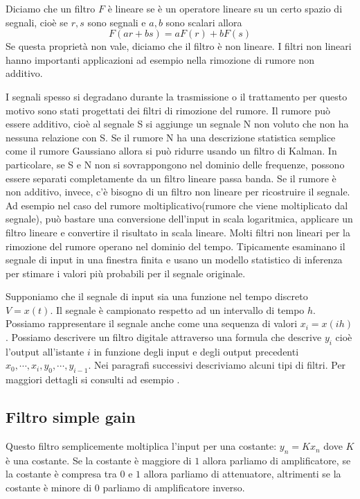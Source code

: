 Diciamo che un filtro $F$ \`e lineare se \`e un operatore lineare su un certo spazio di segnali, cio\`e se $r,s$ sono segnali e $a,b$ sono scalari allora 
\[
  F(ar + bs) = aF(r) + bF(s)
\]
Se questa propriet\`a non vale, diciamo che il filtro \`e non lineare. I filtri non lineari hanno importanti applicazioni ad esempio nella rimozione di rumore non additivo. 



I segnali spesso si degradano durante la trasmissione o il trattamento per questo motivo sono stati progettati dei filtri di rimozione del rumore. Il rumore pu\`o essere additivo, cio\`e al segnale S si aggiunge un segnale N non voluto che non ha nessuna relazione con S. Se il rumore N ha una descrizione statistica semplice come il rumore Gaussiano allora si pu\`o ridurre usando un filtro di Kalman. In particolare, se S e N non si sovrappongono nel dominio delle frequenze, possono essere separati completamente da un filtro lineare passa banda. 
Se il rumore \`e non additivo, invece, c'\`e bisogno di un filtro non lineare per ricostruire il segnale. Ad esempio nel caso del rumore moltiplicativo(rumore che viene moltiplicato dal segnale), pu\`o bastare una conversione dell'input in scala logaritmica, applicare un filtro lineare e convertire il risultato in scala lineare. 
Molti filtri non lineari per la rimozione del rumore operano nel dominio del tempo. Tipicamente esaminano il segnale di input in una finestra finita 
e usano un modello statistico di inferenza per stimare i valori pi\`u probabili per il segnale originale.



Supponiamo che il segnale di input sia una funzione nel tempo discreto $V=x(t)$. Il segnale \`e campionato respetto ad un intervallo di tempo $h$. Possiamo rappresentare il segnale anche come una sequenza di valori $x_{i}=x(ih)$.  Possiamo descrivere un filtro digitale attraverso una formula che descrive $y_{i}$ cio\`e l'output all'istante $i$ in funzione degli input e degli output precedenti $x_{0}, \cdots, x_{i}, y_{0}, \cdots, y_{i-1}$. Nei paragrafi successivi descriviamo alcuni tipi di filtri. Per maggiori dettagli si consulti ad esempio \cite{filtri}.
\subsection{Filtro simple gain}
    Questo filtro semplicemente moltiplica l'input per una costante: $y_{n} = K x_{n}$ dove $K$ \`e una costante. Se la costante \`e maggiore di $1$ allora parliamo di amplificatore, se la costante \`e compresa tra $0$ e $1$ allora parliamo di attenuatore, altrimenti se la costante \`e minore di $0$ parliamo di amplificatore inverso.
